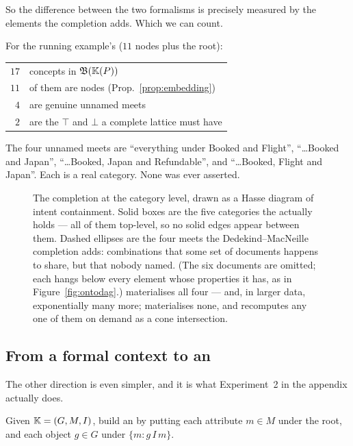 So the difference between the two formalisms is precisely measured by the
elements the completion adds. Which we can count.

\begin{measured}
For the running example's \odag{} ($11$ nodes plus the root):
\begin{center}\small
\begin{tabular}{rl}
\toprule
$17$ & concepts in $\mathfrak{B}(\mathbb{K}(P))$\\
$11$ & of them are \odag{} nodes (Prop.~\ref{prop:embedding})\\
$4$  & are genuine unnamed meets\\
$2$  & are the $\top$ and $\bot$ a complete lattice must have\\
\bottomrule
\end{tabular}
\end{center}
The four unnamed meets are ``everything under \textsf{Booked} and
\textsf{Flight}'', ``\ldots \textsf{Booked} and \textsf{Japan}'',
``\ldots \textsf{Booked}, \textsf{Japan} and \textsf{Refundable}'', and
``\ldots \textsf{Booked}, \textsf{Flight} and \textsf{Japan}''. Each is a real
category. None was ever asserted.
\end{measured}

\begin{figure}[t]
\centering
{}
\caption{The completion at the category level, drawn as a Hasse diagram of
intent containment. Solid boxes are the five categories the \odag{} actually
holds --- all of them top-level, so no solid edges appear between them.
Dashed ellipses are the four meets the Dedekind--MacNeille completion adds:
combinations that some set of documents happens to share, but that nobody
named. (The six documents are omitted; each hangs below every element whose
properties it has, as in Figure~\ref{fig:ontodag}.) \fca{} materialises all
four --- and, in larger data, exponentially many more; \odag{} materialises
none, and recomputes any one of them on demand as a cone intersection.}
\label{fig:completion}
\end{figure}

\subsection{From a formal context to an \odag{}}

The other direction is even simpler, and it is what
Experiment~2 in the appendix actually does.

\begin{definition}
Given $\mathbb{K} = (G, M, I)$, build an \odag{} by putting each attribute
$m \in M$ under the root, and each object $g \in G$ under
$\{m : g\,I\,m\}$.
\end{definition}

